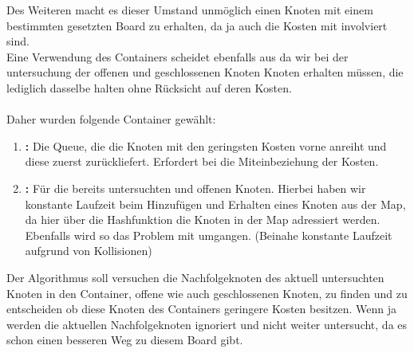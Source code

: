 \documentclass[11pt, a4paper, twoside]{article}   	%
\begin{document}
Des Weiteren macht es dieser Umstand unmöglich einen Knoten mit einem bestimmten gesetzten Board zu erhalten, da ja auch die Kosten mit involviert sind.\\
Eine Verwendung des Containers  scheidet ebenfalls aus da wir bei der untersuchung der offenen und geschlossenen Knoten Knoten erhalten müssen, die lediglich dasselbe  halten ohne Rücksicht auf deren Kosten. \\\\
Daher wurden folgende Container gewählt:\
\begin{enumerate}
	\item \textbf{:} Die Queue, die die Knoten mit den geringsten Kosten vorne anreiht und diese zuerst zurückliefert. Erfordert bei  die Miteinbeziehung der Kosten.
	\item \textbf{\inlineJava{HashMap<Board<T>, SearchNode<T>>}: } Für die bereits untersuchten und offenen Knoten. Hierbei haben wir konstante Laufzeit beim Hinzufügen und Erhalten eines Knoten aus der Map, da hier über die Hashfunktion  die Knoten in der Map adressiert werden. Ebenfalls wird so das Problem mit  umgangen. (Beinahe konstante Laufzeit aufgrund von Kollisionen) 
\end{enumerate}
Der Algorithmus soll versuchen die Nachfolgeknoten des aktuell untersuchten Knoten in den Container, offene wie auch geschlossenen Knoten, zu finden und zu entscheiden ob diese Knoten des Containers geringere Kosten besitzen. Wenn ja werden die aktuellen Nachfolgeknoten ignoriert und nicht weiter untersucht, da es schon einen besseren Weg zu diesem Board gibt.

\newpage
\end{document}
